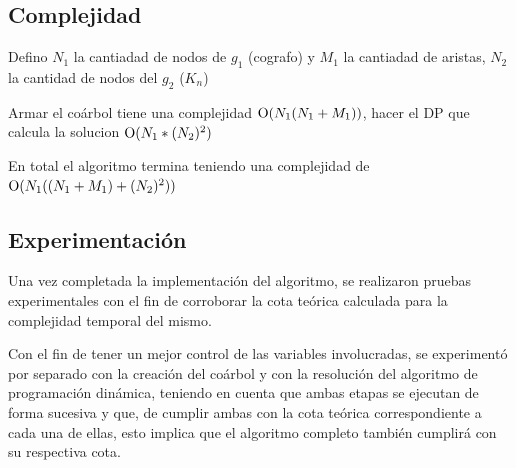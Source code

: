 \subsection{Complejidad}
Defino $N_1$ la cantiadad de nodos de $g_1$ (cografo) y $M_1$ la cantiadad de aristas,
$N_2$ la cantidad de nodos del $g_2$ ($K_n$)

Armar el coárbol tiene una complejidad $\operatorname{O}(N_1(N_1 + M_1))$, hacer el DP que
calcula la solucion $\operatorname{O}(N_1 * (N_2)^2 )$

En total el algoritmo termina teniendo una complejidad de $\operatorname{O}(N_1((N_1 + M_1) + (N_2)^2 ))$

\subsection{Experimentación}
Una vez completada la implementación del algoritmo, se realizaron pruebas
experimentales con el fin de corroborar la cota teórica calculada para la
complejidad temporal del mismo.

Con el fin de tener un mejor control de las variables involucradas, se
experimentó por separado con la creación del coárbol y con la resolución del
algoritmo de programación dinámica, teniendo en cuenta que ambas etapas se
ejecutan de forma sucesiva y que, de cumplir ambas con la cota teórica
correspondiente a cada una de ellas, esto implica que el algoritmo completo
también cumplirá con su respectiva cota.



